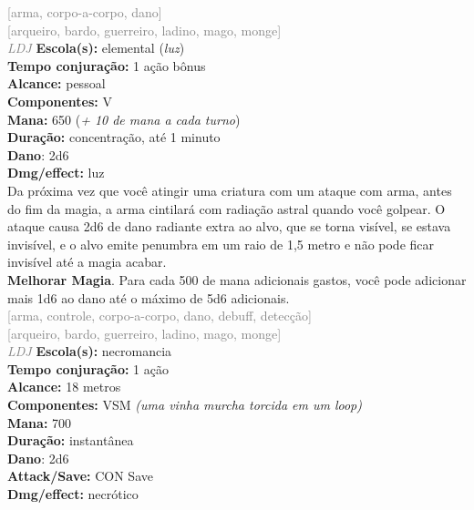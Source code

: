 \documentclass{RPG_Adventure}[2021/10/20]
\begin{document}
{\scriptsize \textcolor{gray}{[arma, corpo-a-corpo, dano]\\}}
{\scriptsize \textcolor{gray}{[arqueiro, bardo, guerreiro, ladino, mago, monge]\\}}
{\tiny \textcolor{gray}{\textit{LDJ}}}\jump{}
{\small \t \textbf{Escola(s):} elemental (\textit{luz})\\\t \textbf{Tempo conjuração:} 1 ação bônus\\\t \textbf{Alcance:} pessoal\\\t \textbf{Componentes:} V\\\t \textbf{Mana:} 650 (\textit{+ 10 de mana a cada turno})\\\t \textbf{Duração:} concentração, até 1 minuto\\\t \textbf{Dano}: 2d6\\\t \textbf{Dmg/effect:} luz\\}
{\normalsize Da próxima vez que você atingir uma criatura com um ataque com arma, antes do fim da magia, a arma cintilará com radiação astral quando você golpear. O ataque causa 2d6 de dano radiante extra ao alvo, que se torna visível, se estava invisível, e o alvo emite penumbra em um raio de 1,5 metro e não pode ficar invisível até a magia acabar.\\\t \textbf{Melhorar Magia}. Para cada 500 de mana adicionais gastos, você pode adicionar mais 1d6 ao dano até o máximo de 5d6 adicionais.\\}
{\scriptsize \textcolor{gray}{[arma, controle, corpo-a-corpo, dano, debuff, detecção]\\}}
{\scriptsize \textcolor{gray}{[arqueiro, bardo, guerreiro, ladino, mago, monge]\\}}
{\tiny \textcolor{gray}{\textit{LDJ}}}\jump{}
{\small \t \textbf{Escola(s):} necromancia\\\t \textbf{Tempo conjuração:} 1 ação\\\t \textbf{Alcance:} 18 metros\\\t \textbf{Componentes:} VSM \textit{(uma vinha murcha torcida em um loop)}\\\t \textbf{Mana:} 700\\\t \textbf{Duração:} instantânea\\\t \textbf{Dano}: 2d6\\\t \textbf{Attack/Save:} CON Save\\\t \textbf{Dmg/effect:} necrótico\\}
\end{document}
